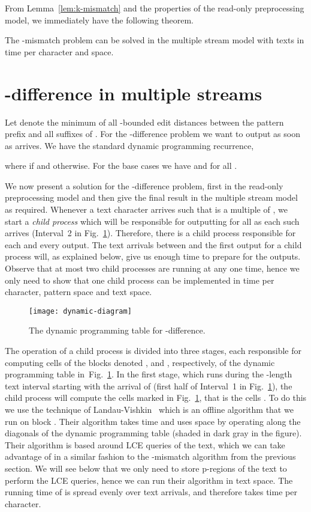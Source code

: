 \documentclass[envcountsame]{llncs}
\newcommand{\pregions}{\mbox{p-regions}\xspace}
\begin{document}
From Lemma~\ref{lem:k-mismatch} and the properties of the read-only
preprocessing model, we immediately have the following theorem.

\begin{theorem}
    The -mismatch problem can be solved in the multiple stream model with  texts in  time per character and  space.
\end{theorem}



\section{-difference in multiple streams}\label{sec:k-diff}

Let  denote the minimum of all -bounded edit distances between the pattern prefix  and all suffixes of . For the -difference problem we want to output  as soon as  arrives. We have the standard dynamic programming recurrence,

where  if  and  otherwise. For the base cases we have  and  for all .

We now present a solution for the -difference problem, first in
the read-only preprocessing model and then give the final result in
the multiple stream model as required.  Whenever a text character  arrives such that  is a multiple of , we start a \emph{child process} which will be responsible for outputting  for all  as each such  arrives (Interval~2 in Fig.~\ref{fig:dynamic}). Therefore, there is a child process responsible for each and every output. The  text arrivals between  and the first output for a child process will, as explained below, give us enough time to prepare for the outputs. Observe that at most two child processes are running at any one time, hence we only need to show that one child process can be implemented in  time per character,   pattern space and  text space.
\begin{figure}[ht]
    \hskip 45pt \texttt{[image: dynamic-diagram]}
    \caption{\label{fig:dynamic} The dynamic programming table for -difference.}
\end{figure}

The operation of a child process is divided into three stages, each responsible for computing cells of the blocks denoted ,  and , respectively, of the dynamic programming table in~Fig.~\ref{fig:dynamic}. In the first stage, which runs during the -length text interval starting with the arrival of  (first half of Interval~1 in Fig.~\ref{fig:dynamic}), the child process will compute the cells marked  in Fig.~\ref{fig:dynamic}, that is the cells . To do this we use the technique of Landau-Vishkin~\cite{LV:1988} which is an offline algorithm that we run on block . Their algorithm takes  time and uses  space by operating along the diagonals of the dynamic programming table (shaded in dark gray in the figure). Their algorithm is based around LCE queries of the text, which we can take advantage of in a similar fashion to the -mismatch algorithm from the previous section. We will see below that we only need to store  \pregions of the text to perform the LCE queries, hence we can run their algorithm in  text space. The running time of  is spread evenly over  text arrivals, and therefore takes  time per character.
\end{document}
